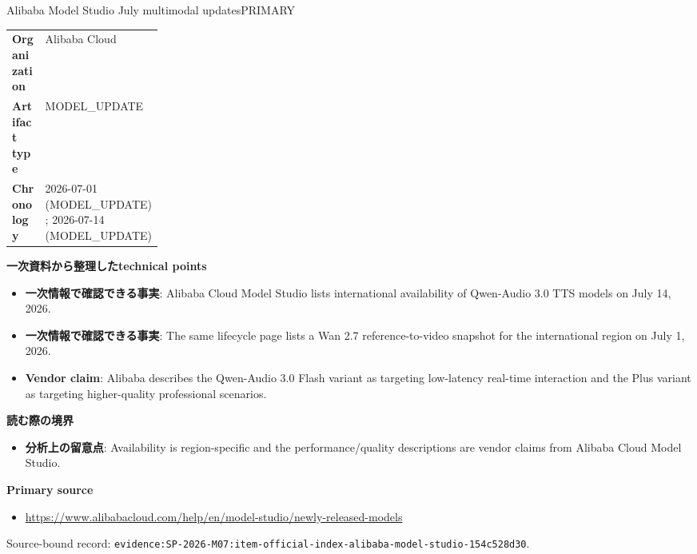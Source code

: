 \begin{technicalnote}{Alibaba Model Studio July multimodal updates}{PRIMARY}
\begin{tabularx}{\linewidth}{@{}>{\bfseries}p{0.22\linewidth}X@{}}
Organization & Alibaba Cloud \\
Artifact type & MODEL\_UPDATE \\
Chronology & 2026-07-01 (MODEL\_UPDATE); 2026-07-14 (MODEL\_UPDATE) \\
\end{tabularx}
\smallskip
{\bfseries 一次資料から整理したtechnical points}
\begin{itemize}[leftmargin=1.5em,itemsep=0.35em]
\item \textbf{一次情報で確認できる事実}: Alibaba Cloud Model Studio lists international availability of Qwen-Audio 3.0 TTS models on July 14, 2026.
\item \textbf{一次情報で確認できる事実}: The same lifecycle page lists a Wan 2.7 reference-to-video snapshot for the international region on July 1, 2026.
\item \textbf{Vendor claim}: Alibaba describes the Qwen-Audio 3.0 Flash variant as targeting low-latency real-time interaction and the Plus variant as targeting higher-quality professional scenarios.
\end{itemize}
{\bfseries 読む際の境界}
\begin{itemize}[leftmargin=1.5em,itemsep=0.35em]
\item \textbf{分析上の留意点}: Availability is region-specific and the performance/quality descriptions are vendor claims from Alibaba Cloud Model Studio.
\end{itemize}
{\bfseries Primary source}
\begin{itemize}[leftmargin=1.5em,itemsep=0.25em]
\item \url{https://www.alibabacloud.com/help/en/model-studio/newly-released-models}
\end{itemize}
{\scriptsize\color{SurveyMuted}Source-bound record: \texttt{evidence:SP-2026-M07:item-official-index-alibaba-model-studio-154c528d30}.}
\end{technicalnote}
\medskip

